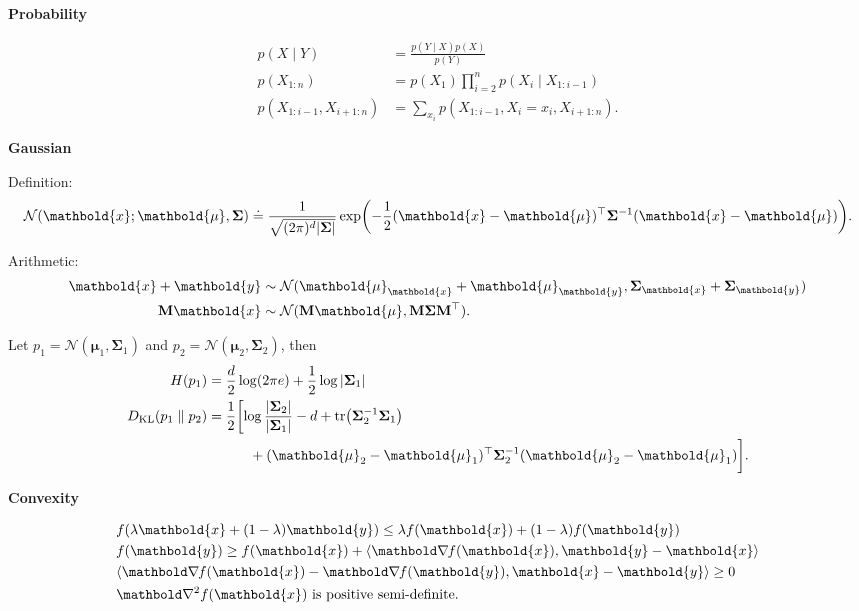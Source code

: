 \documentclass[10pt]{article}
\newenvironment{subtopic}[1]
{\vspace{0.1cm} \begin{center}\textbf{\footnotesize \sffamily #1}\end{center}}
{}
\renewcommand{\det}[1]{|#1|}
\renewcommand{\mat}[1]{\ensuremath{\mathbf{#1}}}
\renewcommand{\vec}[1]{\ensuremath{\mathbold{#1}}}
\begin{document}
\begin{multicols*}{3}
    \begin{subtopic}{Probability}
        \begin{align*}
            p(X \mid Y) & = \frac{p(Y \mid X) p(X)}{p(Y)} \\
            p(X_{1:n}) & = p(X_1) \prod_{i=2}^n p(X_i \mid X_{1:i-1}) \\
            p(X_{1:i-1},X_{i+1:n}) & = \sum_{x_i} p(X_{1:i-1}, X_i=x_i, X_{i+1:n}).
        \end{align*}
    \end{subtopic}

    \vfill\null
    \columnbreak

    \begin{subtopic}{Gaussian}
        Definition: \[
            \mathcal{N}(\vec{x}; \vec{\mu}, \mat{\Sigma}) \doteq \frac{1}{\sqrt{(2\pi)^{d} \det{\mat{\Sigma}}}} \exp \lft( -\frac{1}{2} \transpose{(\vec{x}-\vec{\mu})} \inv{\mat{\Sigma}} (\vec{x} - \vec{\mu}) \rgt).
        \]

        Arithmetic:
        \begin{align*}
            \vec{x} + \vec{y} & \sim \mathcal{N}(\vec{\mu}_{\vec{x}} + \vec{\mu}_{\vec{y}}, \mat{\Sigma}_{\vec{x}} + \mat{\Sigma}_{\vec{y}})      \\
            \mat{M} \vec{x} & \sim \mathcal{N}(\mat{M} \vec{\mu}, \mat{M}\mat{\Sigma}\transpose{\mat{M}}).
        \end{align*}

        Let $p_1 = \mathcal{N}(\vec{\mu}_1, \mat{\Sigma}_1)$ and $p_2 = \mathcal{N}(\vec{\mu}_2, \mat{\Sigma}_2)$, then
        \begin{align*}
            H(p_1) & = \frac{d}{2} \log(2\pi e) + \frac{1}{2} \log \det{\mat{\Sigma}_1} \\
            D_{\mathrm{KL}}(p_1 \;\|\; p_2) & = \frac{1}{2} \biggl[ \log \frac{\det{\mat{\Sigma}_2}}{\det{\mat{\Sigma}_1}} - d + \tr{\inv{\mat{\Sigma}_2} \mat{\Sigma}_1} \\
                             & \quad \quad \quad + \transpose{(\vec{\mu}_2 - \vec{\mu}_1)} \inv{\mat{\Sigma}_2} (\vec{\mu}_2 - \vec{\mu}_1) \biggr].
        \end{align*}
    \end{subtopic}

    \begin{subtopic}{Convexity}
        \begin{align*}
            & f(\lambda \vec{x} + (1-\lambda) \vec{y}) \leq \lambda f(\vec{x}) + (1-\lambda) f(\vec{y}) \\
            & f(\vec{y}) \geq f(\vec{x}) + \langle \grad{f(\vec{x})}{}, \vec{y} - \vec{x} \rangle       \\
            & \langle \grad{f(\vec{x})}{} - \grad{f(\vec{y})}{}, \vec{x} - \vec{y} \rangle \geq 0       \\
            & \text{$\hess{f(\vec{x})}{}$ is positive semi-definite.}
        \end{align*}
    \end{subtopic}


\end{multicols*}
\end{document}
